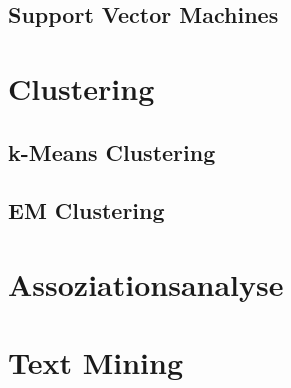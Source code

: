 \documentclass{article}
\begin{document}
\subsection{Support Vector Machines}
\section{Clustering}
\subsection{k-Means Clustering}
\subsection{EM Clustering}
\section{Assoziationsanalyse}
\section{Text Mining}
\end{document}

